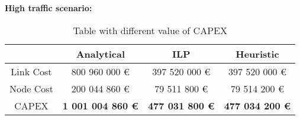 \vspace{11pt}
\textbf{High traffic scenario:}\\

\begin{table}[h!]
\centering
\begin{tabular}{| c | c | c | c |}
 \hline
   & Analytical & ILP & Heuristic \\
 \hline\hline
 Link Cost & 800 960 000 \euro & 397 520 000 \euro & 397 520 000 \euro \\
 Node Cost & 200 044 860 \euro & 79 511 800 \euro & 79 514 200 \euro \\
 CAPEX & \textbf{1 001 004 860 \euro} & \textbf{477 031 800 \euro} & \textbf{477 034 200 \euro} \\
 \hline
\end{tabular}
\caption{Table with different value of CAPEX }
\label{table_comparative_opaque_protec_ref_3}
\end{table}

